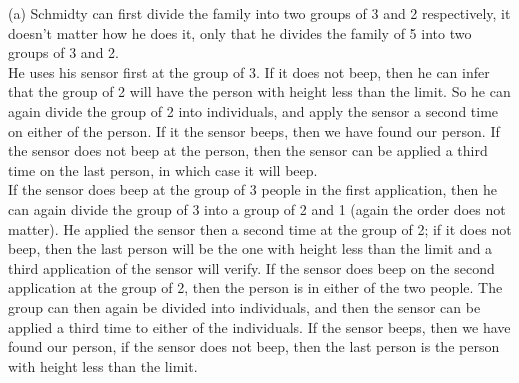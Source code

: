 \documentclass[a4paper]{exam}
\begin{document}
\begin{questions}
\begin{minipage}{.65\linewidth}
\end{minipage}
\begin{solution}
    (a) Schmidty can first divide the family into two groups of 3 and 2 respectively, it doesn't matter how he does it, only that he divides the family of 5 into two groups of 3 and 2. \\ 
    He uses his sensor first at the group of 3. If it does not beep, then he can infer that the group of 2 will have the person with height less than the limit. So he can again divide the group of 2 into individuals, and apply the sensor a second time on either of the person. If it the sensor beeps, then we have found our person. If the sensor does not beep at the person, then the sensor can be applied a third time on the last person, in which case it will beep. \\ 
    If the sensor does beep at the group of 3 people in the first application, then he can again divide the group of 3 into a group of 2 and 1 (again the order does not matter). He applied the sensor then a second time at the group of 2; if it does not beep, then the last person will be the one with height less than the limit and a third application of the sensor will verify. If the sensor does beep on the second application at the group of 2, then the person is in either of the two people. The group can then again be divided into individuals, and then the sensor can be applied a third time to either of the individuals. If the sensor beeps, then we have found our person, if the sensor does not beep, then the last person is the person with height less than the limit.
    

\end{solution}
\end{questions}
\end{document}
